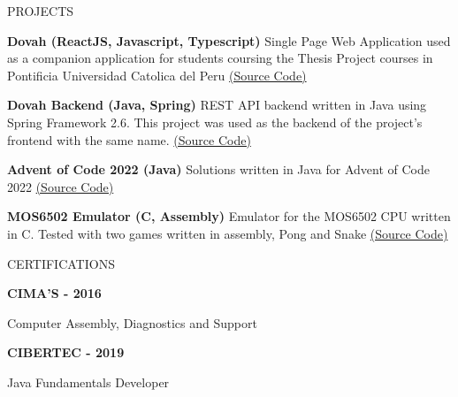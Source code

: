 \documentclass{resume} %
\begin{document}
    \begin{rSection}{PROJECTS}
        \vspace{-1.25em}
        \item \textbf{Dovah (ReactJS, Javascript, Typescript)} {Single Page Web Application used as a companion application for students coursing the Thesis Project courses in Pontificia Universidad Catolica del Peru \href{https://github.com/PUCP-INF/Dovah-Frontend}{(Source Code)}}
        \item \textbf{Dovah Backend (Java, Spring)} {REST API backend written in Java using Spring Framework 2.6.
        This project was used as the backend of the project's frontend with the same name. \href{https://github.com/PUCP-INF/Dovah-Backend}{(Source Code)}}
        \item \textbf{Advent of Code 2022 (Java)} {Solutions written in Java for Advent of Code 2022 \href{https://github.com/csantv/AdventOfCode2022}{(Source Code)}}
        \item \textbf{MOS6502 Emulator (C, Assembly)} {Emulator for the MOS6502 CPU written in C. Tested with two games written in assembly, Pong and Snake \href{https://github.com/csantv/mos6502-emulator}{(Source Code)}}
    \end{rSection}

    \begin{rSection}{CERTIFICATIONS}
        \vspace{-1.25em}
        \item \textbf{CIMA'S - 2016}
        \item {Computer Assembly, Diagnostics and Support}
        \item \textbf{CIBERTEC - 2019}
        \item {Java Fundamentals Developer}
    \end{rSection}
\end{document}
